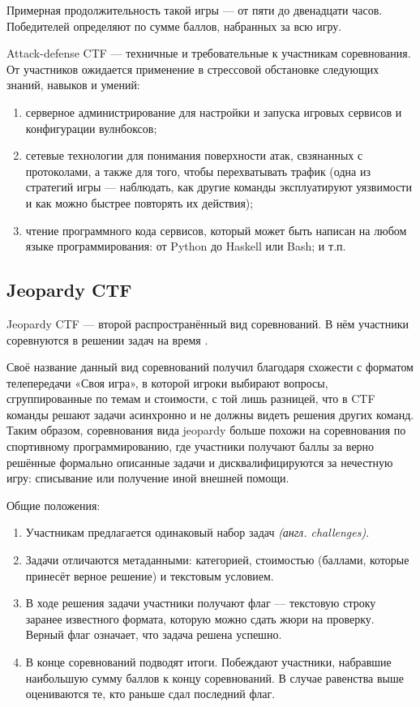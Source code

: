 Примерная продолжительность такой игры --- от пяти до двенадцати часов. Победителей определяют по сумме баллов, набранных за всю игру.

Attack-defense CTF — техничные и требовательные к участникам соревнования. От участников ожидается применение в стрессовой обстановке следующих знаний, навыков и умений:
\begin{enumerate}
  \item серверное администрирование для настройки и запуска игровых сервисов и конфигурации вулнбоксов;
  \item сетевые технологии для понимания поверхности атак, свзянанных с протоколами, а также для того, чтобы перехватывать трафик (одна из стратегий игры --- наблюдать, как другие команды эксплуатируют уязвимости и как можно быстрее повторять их действия\cite{ReplayAttacks});
  \item чтение программного кода сервисов, который может быть написан на любом языке программирования: от Python\cite{PythonService} до Haskell\cite{HaskellSerivce} или Bash\cite{BashService}; и т.п.
\end{enumerate}



\subsection{Jeopardy CTF}
\label{cha:analysis:jeopardy}

Jeopardy CTF — второй распространённый вид соревнований. В нём участники соревнуются в решении задач на время \cite{Course}.

Своё название данный вид соревнований получил благодаря схожести с форматом телепередачи «Своя игра», в которой игроки выбирают вопросы, сгруппированные по темам и стоимости, с той лишь разницей, что в CTF команды решают задачи асинхронно и не должны видеть решения других команд. Таким образом, соревнования вида jeopardy больше похожи на соревнования по спортивному программированию, где участники получают баллы за верно решённые формально описанные задачи и дисквалифицируются за нечестную игру: списывание или получение иной внешней помощи.

Общие положения:

\begin{enumerate}
  \item Участникам предлагается одинаковый набор задач \textit{(англ. challenges)}.
  \item Задачи отличаются метаданными: категорией, стоимостью (баллами, которые принесёт верное решение) и текстовым условием.
  \item В ходе решения задачи участники получают флаг — текстовую строку заранее известного формата, которую можно сдать жюри на проверку. Верный флаг означает, что задача решена успешно.
  \item В конце соревнований подводят итоги. Побеждают участники, набравшие наибольшую сумму баллов к концу соревнований. В случае равенства выше оцениваются те, кто раньше сдал последний флаг.
\end{enumerate}


